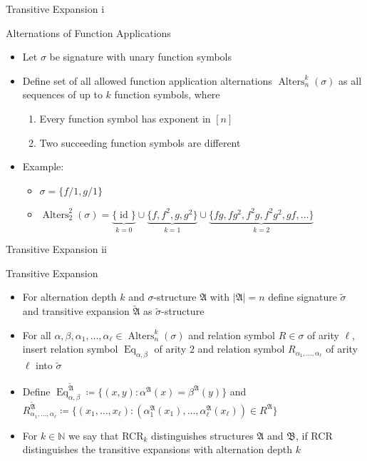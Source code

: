 \documentclass[aspectratio=169]{beamer}
\begin{document}
	\begin{frame}{Transitive Expansion i}
		\begin{block}{Alternations of Function Applications}
			\begin{itemize}
				\item Let $\sigma$ be signature with unary function symbols
				\item Define set of all allowed function application alternations $\operatorname{Alters}^k_n(\sigma)$ as all sequences of up to $k$ function symbols, where 
				\begin{enumerate}
					\item Every function symbol has exponent in $[n]$
					\item Two succeeding function symbols are different
				\end{enumerate}
			\end{itemize}
		\end{block}
		\begin{itemize}
			\item Example: 
			\begin{itemize}
				\item $\sigma=\{f/1,g/1\}$
				\item $\operatorname{Alters}^2_2(\sigma)=\underbrace{\{\operatorname{id}\}}_{k=0} \cup \underbrace{\{f,f^2,g,g^2\}}_{k=1} \cup \underbrace{\{fg, fg^2, f^2g, f^2g^2, gf, \dots\}}_{k=2}$
			\end{itemize}
		\end{itemize}
	\end{frame}
	
	\begin{frame}{Transitive Expansion ii}
		\begin{block}{Transitive Expansion}
			\begin{itemize}
				\item For alternation depth $k$ and $\sigma$-structure $\mathfrak A$ with $\vert \mathfrak A\vert = n$ define signature $\widetilde{\sigma}$ and transitive expansion $\widetilde{\mathfrak A}$ as $\widetilde{\sigma}$-structure
				\item For all $\alpha,\beta,\alpha_1,\dots,\alpha_\ell\in \operatorname{Alters}^k_n(\sigma)$ and relation symbol $R\in\sigma$ of arity $\ell$, insert relation symbol $\operatorname{Eq}_{\alpha,\beta}$ of arity $2$ and relation symbol $R_{\alpha_1,\dots,\alpha_\ell}$ of arity $\ell$ into $\widetilde{\sigma}$
				\item Define $\operatorname{Eq}_{\alpha,\beta}^{\widetilde{\mathfrak A}}\coloneqq \{(x,y) : \alpha^{\mathfrak A}(x)=\beta^{\mathfrak A}(y)\}$ and $R_{\alpha_1,\dots,\alpha_\ell}^{\widetilde{\mathfrak A}}\coloneqq \{(x_1,\dots,x_\ell) : (\alpha_1^{\mathfrak A}(x_1),\dots,\alpha_\ell^{\mathfrak A}(x_\ell))\in R^{\mathfrak A}\}$
			\end{itemize}
		\end{block}
		\begin{itemize}
			\item For $k\in\mathbb N$ we say that RCR$_k$ distinguishes structures $\mathfrak A$ and $\mathfrak B$, if RCR distinguishes the transitive expansions with alternation depth $k$
		\end{itemize}
	\end{frame}
	
\end{document}
